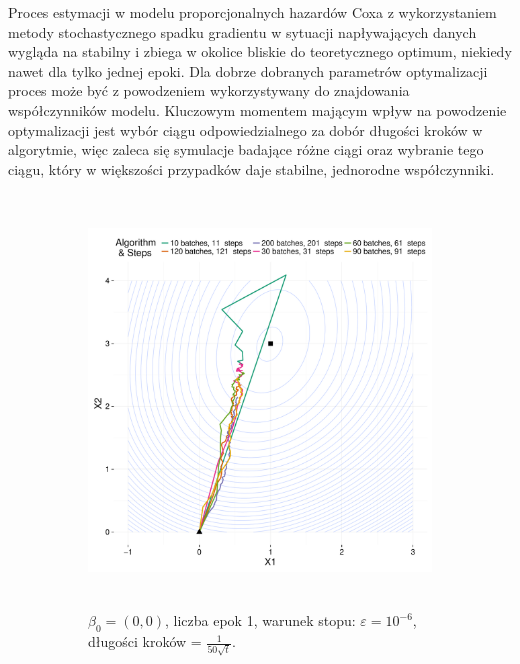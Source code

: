 Proces estymacji w modelu proporcjonalnych hazardów Coxa z wykorzystaniem metody stochastycznego spadku gradientu w sytuacji napływających danych wygląda na stabilny i zbiega w okolice bliskie do teoretycznego optimum, niekiedy nawet dla tylko jednej epoki. Dla dobrze dobranych parametrów optymalizacji proces może być z powodzeniem wykorzystywany do znajdowania współczynników modelu. Kluczowym momentem mającym wpływ na powodzenie optymalizacji jest wybór ciągu odpowiedzialnego za dobór długości kroków w algorytmie, więc zaleca się symulacje badające różne ciągi oraz wybranie tego ciągu, który w większości przypadków daje stabilne, jednorodne współczynniki. 

\begin{figure}[hbt!]
  \begin{center}
   \begin{subfigure}[h!]{0.9\textwidth}
      \includegraphics[width=\textwidth, height=310pt]{Obrazki/b_0_0_iter_1_e-6_50sqrt.pdf}
      \caption{$\beta_0=(0,0)$, liczba epok 1, warunek stopu: $\varepsilon=10^{-6}$, długości kroków = $\frac{1}{50\sqrt{t}}$.}
   \end{subfigure}     
   \begin{subfigure}[h!]{0.9\textwidth}

\end{subfigure}
\end{center}
\end{figure}
